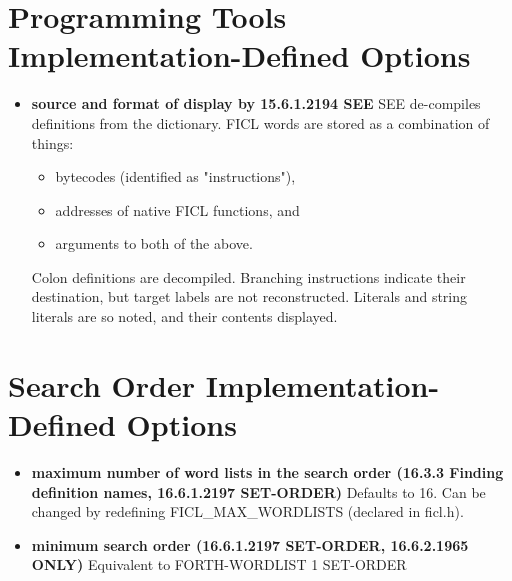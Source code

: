 \section{Programming Tools Implementation-Defined Options}
\begin{itemize}[noitemsep]
	\item \textbf{source and format of display by 15.6.1.2194
		SEE}\newline
	SEE de-compiles definitions from the dictionary. FICL words are
	stored as a combination of things:
	\begin{itemize}[noitemsep]
		\item bytecodes (identified as "instructions"),
		\item addresses of native FICL functions, and
		\item arguments to both of the above.
	\end{itemize}
	Colon definitions are decompiled. Branching instructions
	indicate their destination, but target labels are not
	reconstructed. Literals and string literals are so noted, and
	their contents displayed.
\end{itemize}


\section{Search Order Implementation-Defined Options}
\begin{itemize}[noitemsep]
	\item \textbf{maximum number of word lists in the search order
		(16.3.3 Finding definition names, 16.6.1.2197
		SET-ORDER)}\newline
	Defaults to 16. Can be changed by redefining
	FICL\_MAX\_WORDLISTS (declared in ficl.h).

	\item \textbf{minimum search order (16.6.1.2197 SET-ORDER,
		16.6.2.1965 ONLY)}\newline
	Equivalent to FORTH-WORDLIST 1 SET-ORDER
\end{itemize}



